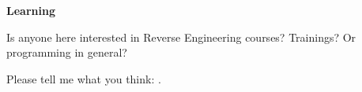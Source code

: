 \vspace*{\fill}

\large \textbf{Learning}

\bigskip
\bigskip
\bigskip

Is anyone here interested in Reverse Engineering courses? Trainings?
Or programming in general?

Please tell me what you think: \EMAIL.

\normalsize

\bigskip
\bigskip
\bigskip

\vspace*{\fill}
\vfill
